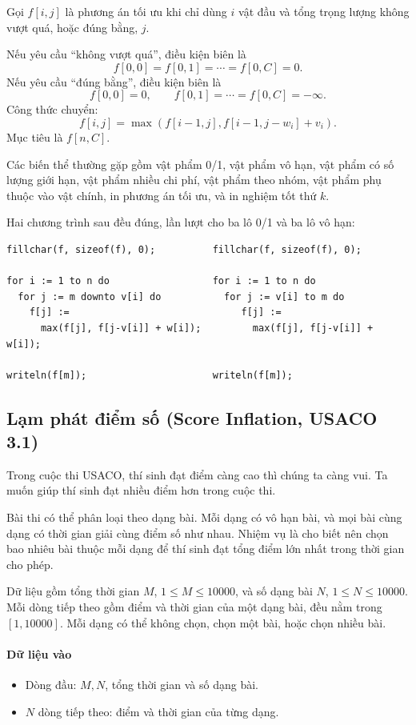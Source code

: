 \documentclass[11pt]{article}
\newcommand{\problem}[1]{\subsection{#1}}
\newcommand{\iosec}[1]{\paragraph{#1}}
\begin{document}
Gọi \(f[i,j]\) là phương án tối ưu khi chỉ dùng \(i\) vật đầu và tổng trọng lượng không vượt quá, hoặc đúng bằng, \(j\).

Nếu yêu cầu ``không vượt quá'', điều kiện biên là
\[
  f[0,0]=f[0,1]=\cdots=f[0,C]=0.
\]
Nếu yêu cầu ``đúng bằng'', điều kiện biên là
\[
  f[0,0]=0,\qquad f[0,1]=\cdots=f[0,C]=-\infty.
\]
Công thức chuyển:
\[
  f[i,j]=\max\left(f[i-1,j], f[i-1,j-w_i]+v_i\right).
\]
Mục tiêu là \(f[n,C]\).

Các biến thể thường gặp gồm vật phẩm 0/1, vật phẩm vô hạn, vật phẩm có số lượng giới hạn, vật phẩm nhiều chi phí, vật phẩm theo nhóm, vật phẩm phụ thuộc vào vật chính, in phương án tối ưu, và in nghiệm tốt thứ \(k\).

Hai chương trình sau đều đúng, lần lượt cho ba lô 0/1 và ba lô vô hạn:
\begin{verbatim}
fillchar(f, sizeof(f), 0);          fillchar(f, sizeof(f), 0);

for i := 1 to n do                  for i := 1 to n do
  for j := m downto v[i] do           for j := v[i] to m do
    f[j] :=                              f[j] :=
      max(f[j], f[j-v[i]] + w[i]);         max(f[j], f[j-v[i]] + w[i]);

writeln(f[m]);                      writeln(f[m]);
\end{verbatim}

\problem{Lạm phát điểm số (Score Inflation, USACO 3.1)}

Trong cuộc thi USACO, thí sinh đạt điểm càng cao thì chúng ta càng vui. Ta muốn giúp thí sinh đạt nhiều điểm hơn trong cuộc thi.

Bài thi có thể phân loại theo dạng bài. Mỗi dạng có vô hạn bài, và mọi bài cùng dạng có thời gian giải cùng điểm số như nhau. Nhiệm vụ là cho biết nên chọn bao nhiêu bài thuộc mỗi dạng để thí sinh đạt tổng điểm lớn nhất trong thời gian cho phép.

Dữ liệu gồm tổng thời gian \(M\), \(1 \le M \le 10000\), và số dạng bài \(N\), \(1 \le N \le 10000\). Mỗi dòng tiếp theo gồm điểm và thời gian của một dạng bài, đều nằm trong \([1,10000]\). Mỗi dạng có thể không chọn, chọn một bài, hoặc chọn nhiều bài.

\iosec{Dữ liệu vào}
\begin{itemize}
  \item Dòng đầu: \(M,N\), tổng thời gian và số dạng bài.
  \item \(N\) dòng tiếp theo: điểm và thời gian của từng dạng.
\end{itemize}
\end{document}
